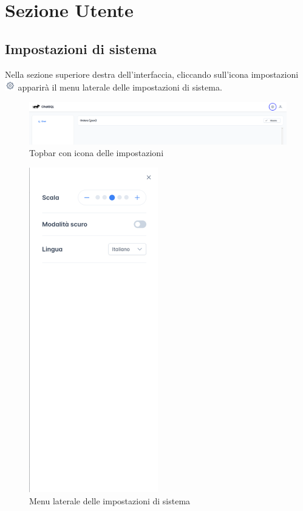 \section{Sezione Utente}
\label{sec:sezUtente}

\subsection{Impostazioni di sistema}
Nella sezione superiore destra dell'interfaccia, cliccando sull'icona impostazioni \includegraphics[height=1.2em]{assets/settings_icon.png} apparirà il menu laterale delle impostazioni di sistema.
\begin{figure}[H]
  \centering
  \includegraphics[width=1\textwidth]{assets/settings_topbar.png}
  \caption{Topbar con icona delle impostazioni}
\end{figure}
\begin{figure}[H]
  \centering
  \includegraphics[width=0.50\textwidth]{assets/menu_config.png}
  \caption{Menu laterale delle impostazioni di sistema}
\end{figure}
